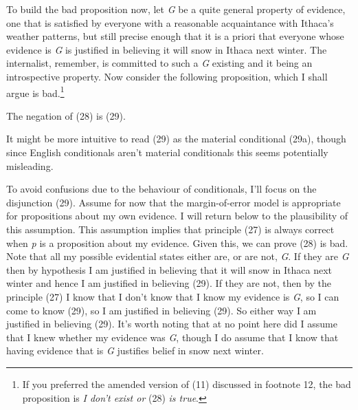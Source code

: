 To build the bad proposition now, let \textit{G} be a quite general property of evidence, one that is satisfied by everyone with a reasonable acquaintance with Ithaca's weather patterns, but still precise enough that it is a priori that everyone whose evidence is \textit{G} is justified in believing it will snow in Ithaca next winter. The internalist, remember, is committed to such a \textit{G} existing and it being an introspective property. Now consider the following proposition, which I shall argue is bad.\footnote{If you preferred the amended version of (11) discussed in footnote 12, the bad proposition is \textit{I don't exist or }(28)\textit{ is true}.}


\noindent The negation of (28) is (29).


\noindent It might be more intuitive to read (29) as the material conditional (29a), though since English conditionals aren't material conditionals this seems potentially misleading.


\noindent To avoid confusions due to the behaviour of conditionals, I'll focus on the disjunction (29). Assume for now that the margin-of-error model is appropriate for propositions about my own evidence. I will return below to the plausibility of this assumption. This assumption implies that principle (27) is always correct when \textit{p} is a proposition about my evidence. Given this, we can prove (28) is bad. Note that all my possible evidential states either are, or are not, \textit{G}. If they are \textit{G} then by hypothesis I am justified in believing that it will snow in Ithaca next winter and hence I am justified in believing (29). If they are not, then by the principle (27) I know that I don't know that I know my evidence is \textit{G}, so I can come to know (29), so I am justified in believing (29). So either way I am justified in believing (29). It's worth noting that at no point here did I assume that I knew whether my evidence was \textit{G}, though I do assume that I know that having evidence that is \textit{G} justifies belief in snow next winter.

